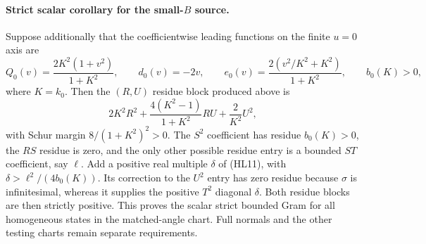 \paragraph{Strict scalar corollary for the small-$B$ source.}
Suppose additionally that the coefficientwise leading functions on
the finite $u=0$ axis are
\[
 Q_0(v)=\frac{2K^2(1+v^2)}{1+K^2},\qquad
 d_0(v)=-2v,\qquad
 e_0(v)=\frac{2(v^2/K^2+K^2)}{1+K^2},
 \qquad b_0(K)>0,
\]
where $K=k_0$.  Then the $(R,U)$ residue block produced above is
\[
 2K^2R^2+\frac{4(K^2-1)}{1+K^2}RU+\frac2{K^2}U^2,
\]
with Schur margin $8/(1+K^2)^2>0$.  The $S^2$ coefficient has
residue $b_0(K)>0$, the $RS$ residue is zero, and the only other
possible residue entry is a bounded $ST$ coefficient, say $\ell$.
Add a positive real multiple $\delta$ of (HL11), with
$\delta>\ell^2/(4b_0(K))$.  Its correction to the $U^2$ entry has
zero residue because $\sigma$ is infinitesimal, whereas it supplies
the positive $T^2$ diagonal $\delta$.  Both residue blocks are then
strictly positive.  This proves the scalar strict bounded Gram for
all homogeneous states in the matched-angle chart.  Full normals
and the other testing charts remain separate requirements.
